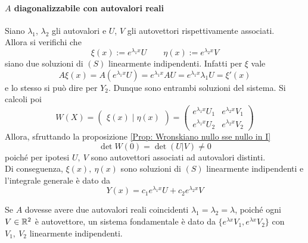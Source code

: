 \paragraph{$A$ diagonalizzabile con autovalori reali}
Siano $\lambda_1$, $\lambda_2$ gli autovalori e $U$, $V$ gli autovettori rispettivamente associati.\\
Allora si verifichi che
\begin{equation}
   \xi(x):= e^{\lambda_1 x}U \qquad
   \eta(x):= e^{\lambda_2 x}V
\end{equation}
siano due soluzioni di $(S)$ linearmente indipendenti.
Infatti per $\xi$ vale
\begin{equation}
    A\xi(x)=A(e^{\lambda_1 x}U)=e^{\lambda_1 x}AU = e^{\lambda_1 x} \lambda_1 U = \xi'(x)
\end{equation}
e lo stesso si può dire per $Y_2$. Dunque sono entrambi soluzioni del sistema.
Si calcoli poi 
\begin{equation}
    W(X)=\begin{pmatrix}
        \xi(x) \mid \eta(x)
    \end{pmatrix} = \begin{pmatrix}
        e^{\lambda_1 x} U_1 & e^{\lambda_2 x} V_1 \\
        e^{\lambda_1 x} U_2 & e^{\lambda_2 x} V_2
    \end{pmatrix}
\end{equation}
Allora, sfruttando la proposizione \ref{Prop: Wronskiano nullo sse nullo in I}
\begin{equation}
    \det W(0)=\det(U | V) \neq 0
\end{equation}
poiché per ipotesi $U,\ V$ sono autovettori associati ad autovalori distinti.\\
Di conseguenza, $\xi(x),\ \eta(x)$ sono soluzioni di $(S)$ linearmente indipendenti e l'integrale generale è dato da
\begin{equation}
    Y(x)= c_1 e^{\lambda_1 x}U + c_2 e^{\lambda_2 x}V
\end{equation}
\begin{oss}
    Se $A$ dovesse avere due autovalori reali coincidenti $\lambda_1=\lambda_2=\lambda$, poiché ogni $V \in \mathbb{R}^2$ è autovettore, un sistema fondamentale è dato da $\{e^{\lambda x}V_1, e^{\lambda x}V_2\}$ con $V_1,\ V_2$ linearmente indipendenti.
\end{oss}
